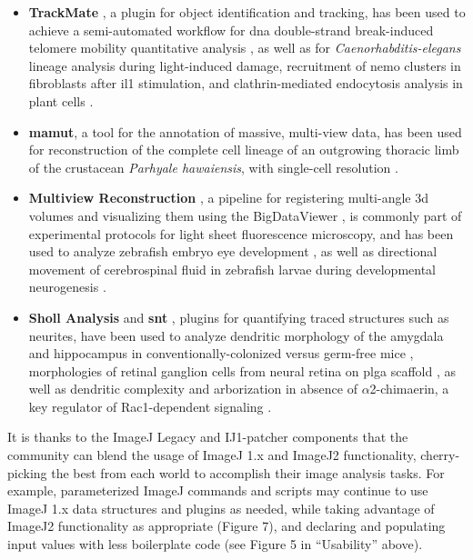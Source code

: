 \documentclass{bmcart}
\begin{document}
\begin{itemize}
  \item \textbf{TrackMate} \cite{trackmate}, a plugin for object
    identification and tracking, has been used to achieve a semi-automated
    workflow for \acrfull{dna} double-strand break-induced telomere mobility
    quantitative analysis \cite{science_trackmate}, as well as for
    \textit{Caenorhabditis-elegans} lineage analysis during light-induced
    damage, recruitment of \acrfull{nemo} clusters in fibroblasts after
    \acrfull{il1} stimulation, and clathrin-mediated endocytosis analysis in
    plant cells \cite{trackmate}.
  \item \textbf{\acrfull{mamut}}, a tool for the annotation of massive,
    multi-view data, has been used for reconstruction of the complete cell
    lineage of an outgrowing thoracic limb of the crustacean \textit{Parhyale
    hawaiensis}, with single-cell resolution \cite{science_mamut}.
  \item \textbf{Multiview Reconstruction} \cite{multiview_2010,
    multiview_2014}, a pipeline for registering multi-angle \acrshort{3d}
    volumes and visualizing them using the BigDataViewer \cite{bigdataviewer},
    is commonly part of experimental protocols for light sheet fluorescence
    microscopy, and has been used to analyze zebrafish embryo eye development
    \cite{science_multiview_1}, as well as directional movement of
    cerebrospinal fluid in zebrafish larvae during developmental neurogenesis
    \cite{science_multiview_2}.
  \item \textbf{Sholl Analysis} \cite{sholl_analysis} and
    \textbf{\acrfull{snt}} \cite{simple_neurite_tracer}, plugins for
    quantifying traced structures such as neurites, have been used to analyze
    dendritic morphology of the amygdala and hippocampus in
    conventionally-colonized versus germ-free mice \cite{science_sholl_1},
    morphologies of retinal ganglion cells from neural retina on
    \acrfull{plga} scaffold \cite{science_sholl_2}, as well as dendritic
    complexity and arborization in absence of $\alpha$2-chimaerin, a key
    regulator of Rac1-dependent signaling \cite{science_sholl_3}.
\end{itemize}

It is thanks to the ImageJ Legacy and IJ1-patcher components that the community
can blend the usage of ImageJ 1.x and ImageJ2 functionality, cherry-picking the
best from each world to accomplish their image analysis tasks. For example,
parameterized ImageJ commands and scripts may continue to use ImageJ 1.x data
structures and plugins as needed, while taking advantage of ImageJ2
functionality as appropriate (Figure 7), and declaring and populating input
values with less boilerplate code (see Figure 5 in ``Usability'' above).
\end{document}

